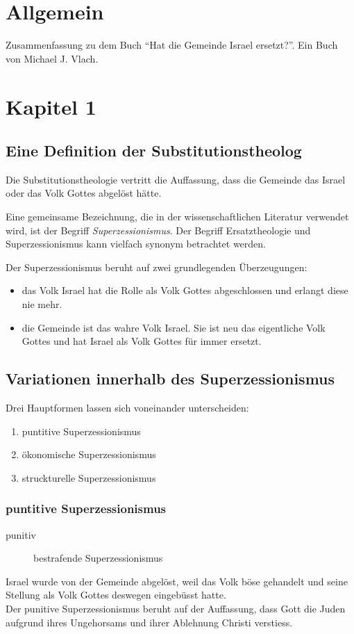 \documentclass{../../inc/mybib}
\newcommand{\st}{Substitutionstheolog}
\newcommand{\sz}{Superzessionismus}
\begin{document}
    \tableofcontents
    \newpage
    \section{Allgemein}
    Zusammenfassung zu dem Buch \enquote{Hat die Gemeinde Israel ersetzt?}. Ein Buch von Michael J. Vlach.
    \section{Kapitel 1}
    \subsection{Eine Definition der \st{}}
    Die Substitutionstheologie vertritt die Auffassung, dass die Gemeinde das Israel oder das Volk Gottes abgelöst hätte.

    Eine gemeinsame Bezeichnung, die in der wissenschaftlichen Literatur verwendet wird, ist der Begriff \textit{\sz}. Der Begriff Ersatztheologie und \sz{} kann vielfach synonym betrachtet werden.

    Der \sz{} beruht auf zwei grundlegenden Überzeugungen:
    \begin{itemize}
        \item das Volk Israel hat die Rolle als Volk Gottes abgeschlossen und erlangt diese nie mehr.
        \item die Gemeinde ist das wahre Volk Israel. Sie ist neu das eigentliche Volk Gottes und hat Israel als Volk Gottes für immer ersetzt.
    \end{itemize}
    \subsection{Variationen innerhalb des \sz{}}
    Drei Hauptformen lassen sich voneinander unterscheiden:
    \begin{enumerate}
        \item puntitive \sz
        \item ökonomische \sz
        \item struckturelle \sz
    \end{enumerate}
    \subsubsection{puntitive \sz}
    \begin{description}
        \item[punitiv] bestrafende \sz 
    \end{description}
    Israel wurde von der Gemeinde abgelöst, weil das Volk böse gehandelt und seine Stellung als Volk Gottes deswegen eingebüsst hatte.\\
    Der punitive \sz{} beruht auf der Auffassung, dass Gott die Juden aufgrund ihres Ungehorsams und ihrer Ablehnung Christi verstiess.\\
    
\end{document}
